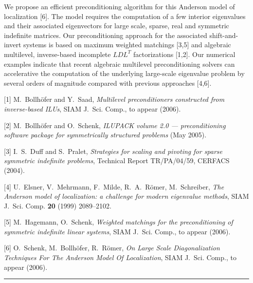\documentclass[twosided]{report}
\begin{document}
We propose
an efficient preconditioning algorithm for this Anderson
model of localization [6]. The model requires the
computation of a few interior eigenvalues and their
associated eigenvectors for large scale, sparse, real and
symmetric indefinite matrices. Our preconditioning approach
for the associated shift-and-invert systems is based on
maximum weighted matchings [3,5] and algebraic multilevel,
inverse-based incomplete $LDL^T$ factorizations [1,2]. Our
numerical examples indicate that recent algebraic multilevel
preconditioning solvers can accelerative the computation of
the underlying large-scale eigenvalue problem by several
orders of magnitude compared with previous approaches [4,6].

[1]
M.~Bollh\"ofer and Y.~Saad,
{\em Multilevel preconditioners
constructed from inverse-based {ILU}s},
SIAM J.~Sci. Comp.,
to appear (2006).

[2]
M.~Bollh\"ofer and O.~Schenk,
{\em {I}{L}{U}{P}{A}{C}{K} volume 2.0 ---
preconditioning software package for
symmetrically structured problems} (May 2005).

[3]
I.~S.~Duff and S.~Pralet,
{\em Strategies for scaling and pivoting for
sparse symmetric indefinite problems},
Technical Report TR/PA/04/59,
CERFACS (2004).

[4]
U.~Elsner, V.~Mehrmann,
F.~Milde, R.~A.~{R\"{o}mer}, M.~Schreiber,
{\em The {Anderson} model of localization: a challenge
for modern eigenvalue methods},
SIAM J.~Sci. Comp.
{\bf 20} (1999) 2089--2102.

[5]
M.~Hagemann, O.~Schenk,
{\em Weighted matchings for the preconditioning
of symmetric indefinite linear systems},
SIAM J.~Sci. Comp.,
to appear (2006).

[6]
O.~Schenk, M.~Bollh\"ofer, R.~R\"omer,
{\em On Large Scale Diagonalization Techniques
For The {Anderson} Model Of Localization},
SIAM J.~Sci. Comp., to appear (2006).



	\begin{center} \rule{6in}{1pt} \end{center}
\end{document}
